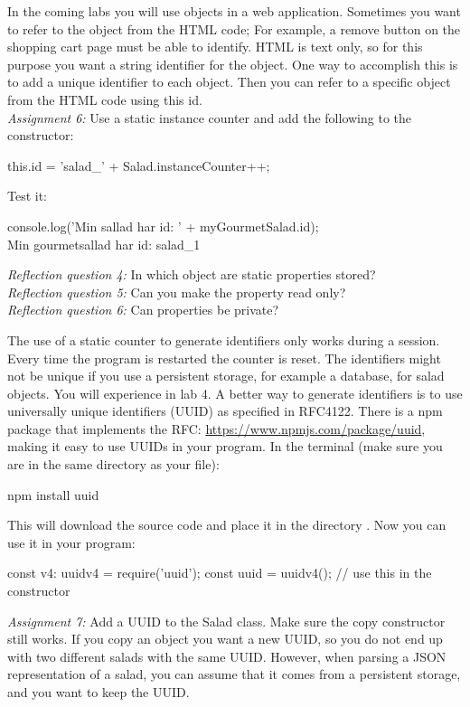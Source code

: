 \documentclass[fleqn, article, a4paper]{memoir}
\begin{document}
\begin{Assignments}
\item In the coming labs you will use  objects in a web application. Sometimes you want to refer to the object from the HTML code; For example, a remove button on the shopping cart page must be able to identify. HTML is text only, so for this purpose you want a string identifier for the object. One way to accomplish this is to add a unique identifier to each  object. Then you can refer to a specific object from the HTML code using this id.
\\\emph{Assignment 6:}
Use a static instance counter and add the following to the  constructor:
\begin{Code}
    this.id = 'salad_' + Salad.instanceCounter++;
\end{Code}
Test it:
\begin{Code}
console.log('Min sallad har id: ' + myGourmetSalad.id);
\\ Min gourmetsallad har id: salad_1
\end{Code}
\emph{Reflection question 4:} In which object are static properties stored?
\\\emph{Reflection question 5:} Can you make the  property read only?
\\\emph{Reflection question 6:} Can properties be private?

\item
The use of a static counter to generate identifiers only works during a session. Every time the program is restarted the counter is reset. The identifiers might not be unique if you use a persistent storage, for example a database, for salad objects. You will experience in lab 4. A better way to generate identifiers is to use universally unique identifiers (UUID) as specified in RFC4122. There is a npm package that implements the RFC: \url{https://www.npmjs.com/package/uuid}, making it easy to use UUIDs in your program. In the terminal (make sure you are in the same directory as your  file):
\begin{Code}
   npm install uuid
\end{Code}
This will download the source code and place it in the directory . Now you can use it in your program:
\begin{Code}
  const { v4: uuidv4 } = require('uuid');
  const uuid = uuidv4();  // use this in the constructor
\end{Code}
\emph{Assignment 7:} Add a UUID to the Salad class. Make sure the copy constructor still works. If you copy an object you want a new UUID, so you do not end up with two different salads with the same UUID. However, when parsing a JSON representation of a salad, you can assume that it comes from a persistent storage, and you want to keep the UUID.

\end{Assignments}
\end{document}
